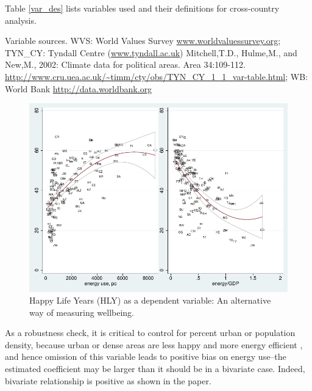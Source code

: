 \documentclass[10pt, letterpaper]{article}
\begin{document}
\begin{spacing}{1.0}
Table \ref{var_des} lists variables used and their definitions for cross-country
analysis. 




{\scriptsize \noindent Variable sources. WVS: World Values Survey \url{www.worldvaluessurvey.org};
TYN\_CY: Tyndall Centre (\url{www.tyndall.ac.uk}) Mitchell,T.D., Hulme,M., and
New,M., 2002: Climate data for political areas. Area
34:109-112. \url{http://www.cru.uea.ac.uk/~timm/cty/obs/TYN_CY_1_1_var-table.html};
WB: World Bank \url{http://data.worldbank.org}}

\begin{figure}[H]
 \includegraphics[width=6in]{graphsAndTables/couWdhEneGdpHly.pdf}\centering
\caption{Happy Life Years (HLY) as a dependent variable: An alternative way of
  measuring wellbeing.}\label{hly}
\end{figure}

As a robustness check, it is critical to control for percent urban or population density, because
urban or dense areas are less happy \citep{aokCityBook15} and more energy
efficient \citep{meyer13}, and hence
omission of this variable leads to positive bias on energy use--the estimated
coefficient may be larger than it should be in a bivariate case. Indeed, bivariate
relationship is positive as shown in the paper. 



\end{spacing}
\end{document}
